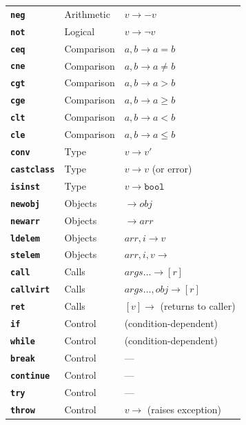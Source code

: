 \documentclass[11pt,a4paper]{article}
\newcommand{\opcode}[1]{\textbf{\texttt{#1}}}
\begin{document}
\begin{longtable}{lll}
  \opcode{neg}       & Arithmetic & $v \to {-}v$ \\
  \opcode{not}       & Logical    & $v \to \neg v$ \\
  \opcode{ceq}       & Comparison & $a, b \to a{=}b$ \\
  \opcode{cne}       & Comparison & $a, b \to a{\neq}b$ \\
  \opcode{cgt}       & Comparison & $a, b \to a{>}b$ \\
  \opcode{cge}       & Comparison & $a, b \to a{\geq}b$ \\
  \opcode{clt}       & Comparison & $a, b \to a{<}b$ \\
  \opcode{cle}       & Comparison & $a, b \to a{\leq}b$ \\
  \opcode{conv}      & Type       & $v \to v'$ \\
  \opcode{castclass} & Type       & $v \to v$ (or error) \\
  \opcode{isinst}    & Type       & $v \to \texttt{bool}$ \\
  \opcode{newobj}    & Objects    & $\to \mathit{obj}$ \\
  \opcode{newarr}    & Objects    & $\to \mathit{arr}$ \\
  \opcode{ldelem}    & Objects    & $\mathit{arr}, i \to v$ \\
  \opcode{stelem}    & Objects    & $\mathit{arr}, i, v \to$ \\
  \opcode{call}      & Calls      & $\mathit{args}\ldots \to [r]$ \\
  \opcode{callvirt}  & Calls      & $\mathit{args}\ldots, \mathit{obj} \to [r]$ \\
  \opcode{ret}       & Calls      & $[v] \to$ (returns to caller) \\
  \opcode{if}        & Control    & (condition-dependent) \\
  \opcode{while}     & Control    & (condition-dependent) \\
  \opcode{break}     & Control    & --- \\
  \opcode{continue}  & Control    & --- \\
  \opcode{try}       & Control    & --- \\
  \opcode{throw}     & Control    & $v \to$ (raises exception) \\
  \bottomrule
\end{longtable}
\end{document}
